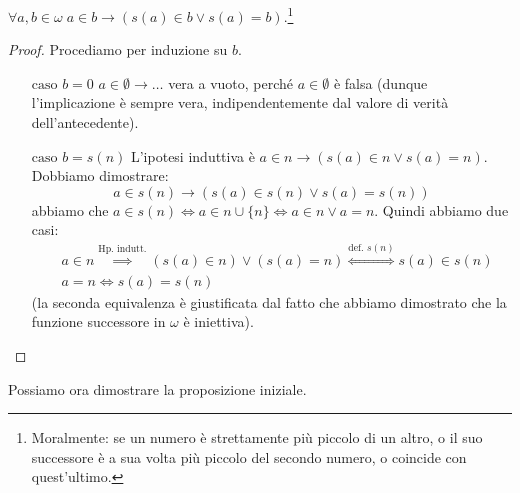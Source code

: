 \documentclass[11pt]{scrartcl}
\begin{document}
\begin{lemma}
	$\forall a,b \in \omega \; a \in b \rightarrow (s(a) \in b \lor s(a) = b)$.\footnote{Moralmente: se un numero è strettamente più piccolo di un altro, o il suo successore è a sua volta più piccolo del secondo numero, o coincide con quest'ultimo.}
\end{lemma}

\begin{proof}
	Procediamo per induzione su $b$.
	\begin{itemize}
		\item[$\boxed{\text{caso $b = 0$}}$] $a \in \emptyset \rightarrow \ldots$ vera a vuoto, perché $a \in \emptyset$ è falsa (dunque l'implicazione è sempre vera, indipendentemente dal valore di verità dell'antecedente).
		\item[$\boxed{\text{caso $b = s(n)$}}$] L'ipotesi induttiva è $a \in n \rightarrow (s(a) \in n \lor s(a) = n)$. Dobbiamo dimostrare:
		\[ a \in s(n) \rightarrow (s(a) \in s(n) \lor s(a) = s(n))
			\]
		abbiamo che $a \in s(n) \iff a \in n \cup \{n\} \iff a \in n \lor a = n$. Quindi abbiamo due casi:
		\[ \begin{split}
			& a \in n \overset{\text{Hp. indutt.}}{\implies} (s(a) \in n) \lor (s(a) = n) \overset{\text{def. $s(n)$}}{\iff} s(a) \in s(n) \\
			& a = n \iff s(a) = s(n)
		\end{split}
			\]
		(la seconda equivalenza è giustificata dal fatto che abbiamo dimostrato che la funzione successore in $\omega$ è iniettiva).
	\end{itemize}
\end{proof}

Possiamo ora dimostrare la proposizione iniziale.
\end{document}
